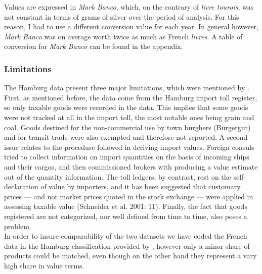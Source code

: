 \documentclass[12pt,a4paper,titlepage,english]{article}
\begin{document}
Values are expressed in \textit{Mark Banco}, which, on the contrary of \textit{livre tourois}, was not constant in terms of grams of silver over the period of analysis. For this reason, I had to use a different conversion value for each year. In general however, \textit{Mark Banco} was on average worth twice as much as French \textit{livres}. A table of conversion for \textit{Mark Banco} can be found in the appendix. 

\subsubsection{Limitations}
The Hamburg data present three major limitations, which were mentioned by \cite{pfister_quantitative_2015}.
First, as mentioned before, the data come from the Hamburg import toll register, so only taxable goods were recorded in the data. This implies that some goods were not tracked at all in the import toll, the most notable ones being grain and coal. 
Goods destined for the non-commercial use by town burghers (Bürgergut) and for transit trade were also exempted and therefore not reported.
A second issue relates to the procedure followed in deriving import values. Foreign consuls tried to collect information on import quantities on the basis of incoming ships and their cargos, and then commissioned brokers with producing a value estimate out of the quantity information. 
The toll ledgers, by contrast, rest on the self-declaration of value by importers, and it has been suggested that customary prices — and not market prices quoted in the stock exchange — were applied in assessing taxable value (Schneider et al. 2001: 11).
Finally, the fact that goods registered are not categorized, nor well defined from time to time, also poses a problem. \\
In order to insure comparability of the two datasets we have coded the French data in the Hamburg classification provided by \cite{pfister_quantitative_2015}, however only a minor share of products could be matched, even though on the other hand they represent a vary high share in value terms. 
\end{document}
